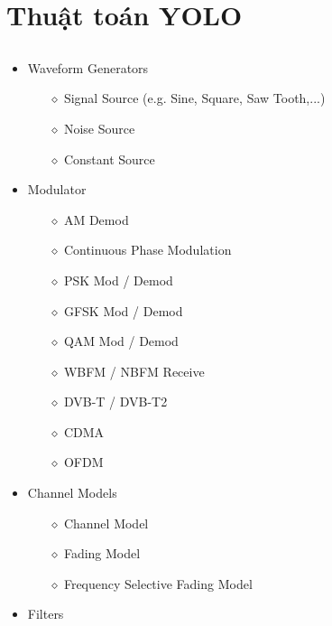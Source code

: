 \clearpage
{}

\setcounter{chapter}{1}
\chapter[{CƠ SỞ LÝ THUYẾT}]{Thuật toán YOLO}

\section{}

\subsection{}

\renewcommand{\labelitemi}{$-$}
\begin{itemize}
\item Waveform Generators 
	\begin{itemize}
		\item[$\diamond$] Signal Source (e.g. Sine, Square, Saw Tooth,...)
		\item[$\diamond$] Noise Source
		\item[$\diamond$] Constant Source
	\end{itemize}
\item Modulator
	\begin{itemize}
		\item[$\diamond$] AM Demod
		\item[$\diamond$] Continuous Phase Modulation
		\item[$\diamond$] PSK Mod / Demod
		\item[$\diamond$] GFSK Mod / Demod
		\item[$\diamond$] QAM Mod / Demod
		\item[$\diamond$] WBFM / NBFM Receive
		\item[$\diamond$] DVB-T / DVB-T2
		\item[$\diamond$] CDMA \cite{Kavitha2015}
		\item[$\diamond$] OFDM \cite{Bloessl2013}
	\end{itemize}
\item  Channel Models 
	\begin{itemize}
		\item[$\diamond$] Channel Model
		\item[$\diamond$] Fading Model
		\item[$\diamond$] Frequency Selective Fading Model
	\end{itemize}
\item Filters

\end{itemize}
